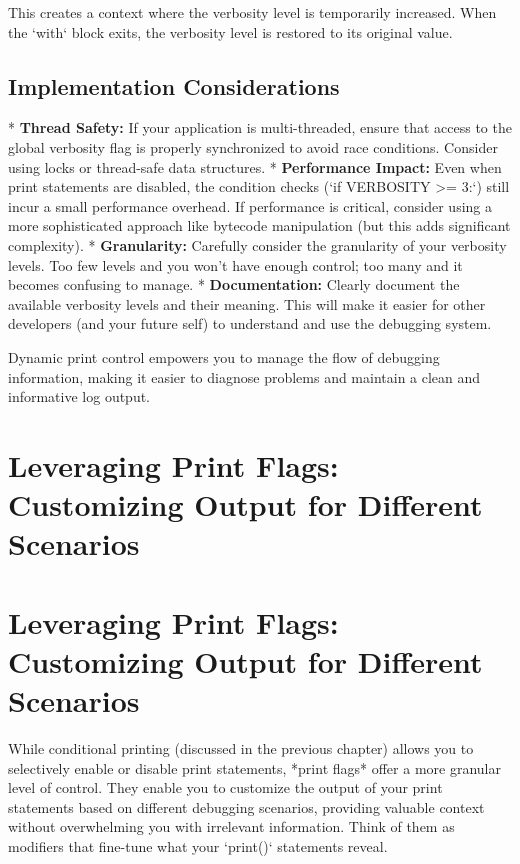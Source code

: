 \documentclass{article}
\begin{document}
{{{This creates a context where the verbosity level is temporarily increased. When the `with` block exits, the verbosity level is restored to its original value.

\subsection*{Implementation Considerations}

*   \textbf{Thread Safety:} If your application is multi-threaded, ensure that access to the global verbosity flag is properly synchronized to avoid race conditions.  Consider using locks or thread-safe data structures.
*   \textbf{Performance Impact:}  Even when print statements are disabled, the condition checks (`if VERBOSITY >= 3:`) still incur a small performance overhead.  If performance is critical, consider using a more sophisticated approach like bytecode manipulation (but this adds significant complexity).
*   \textbf{Granularity:} Carefully consider the granularity of your verbosity levels.  Too few levels and you won't have enough control; too many and it becomes confusing to manage.
*   \textbf{Documentation:} Clearly document the available verbosity levels and their meaning.  This will make it easier for other developers (and your future self) to understand and use the debugging system.

Dynamic print control empowers you to manage the flow of debugging information, making it easier to diagnose problems and maintain a clean and informative log output.

\newpage

\section*{Leveraging Print Flags: Customizing Output for Different Scenarios} %
\label{chapter-4-4-Leveraging_Print_Flags__Customizing_Outp}

\section*{Leveraging Print Flags: Customizing Output for Different Scenarios}

While conditional printing (discussed in the previous chapter) allows you to selectively enable or disable print statements, *print flags* offer a more granular level of control. They enable you to customize the output of your print statements based on different debugging scenarios, providing valuable context without overwhelming you with irrelevant information. Think of them as modifiers that fine-tune what your `print()` statements reveal.

}}}
\end{document}
